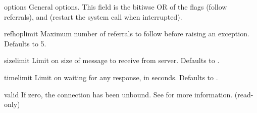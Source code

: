 
\begin{memberdesc}[LDAP]{options} %
    General options. This field is the bitiwse OR of the flags
	 (follow referrals), and
	   (restart the  system call
			      when interrupted).
\end{memberdesc}


\begin{memberdesc}[LDAP]{refhoplimit} %
    Maximum number of referrals to follow before raising an exception.
    Defaults to 5.
\end{memberdesc}


\begin{memberdesc}[LDAP]{sizelimit} %
    Limit on size of message to receive from server. 
    Defaults to .
\end{memberdesc}


\begin{memberdesc}[LDAP]{timelimit} %
    Limit on waiting for any response, in seconds. 
    Defaults to .
\end{memberdesc}


\begin{memberdesc}[LDAP]{valid} %
    If zero, the connection has been unbound. See  for
    more information.
    (read-only)
\end{memberdesc}
